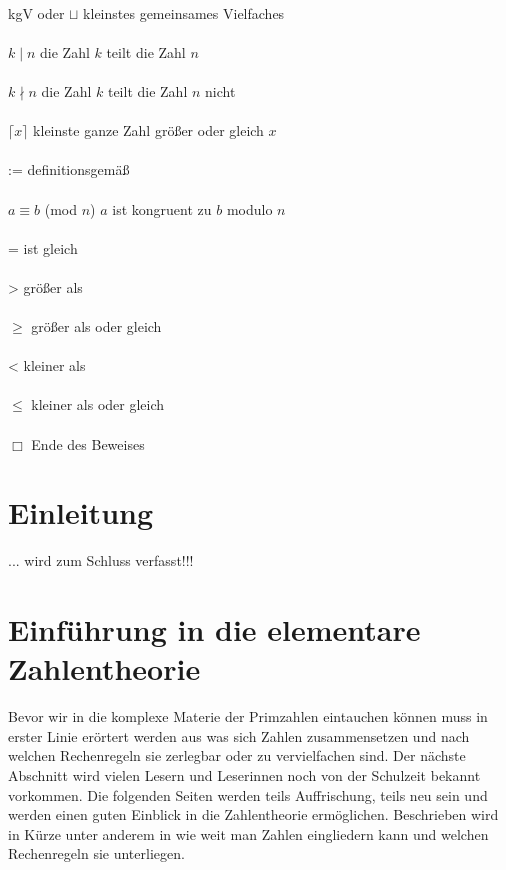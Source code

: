 \documentclass[german,12pt,a4paper]{article}
\begin{document}
\begin{tabbing}
\\kgV  oder $\sqcup$      \> kleinstes gemeinsames Vielfaches\\
\\$k \mid n$              \> die Zahl $k$ teilt die Zahl $n$\\
\\$k \nmid n$             \> die Zahl $k$ teilt die Zahl $n$ nicht\\
\\$\lceil{x}\rceil$       \> kleinste ganze Zahl größer oder gleich $x$\\
\\:=                      \> definitionsgemäß\\
\\$a\equiv b$ (mod $n$)   \> $a$ ist kongruent zu $b$ modulo $n$\\
\\=                       \> ist gleich\\
\\>                       \> größer als\\
\\$\geq$                  \> größer als oder gleich\\
\\<                       \> kleiner als\\
\\$\leq$                  \> kleiner als oder gleich\\
\\$\Box$                  \> Ende des Beweises

\end{tabbing}
\newpage

\section*{Einleitung}
... wird zum Schluss verfasst!!!\newpage

\setcounter{section}{0}
\setcounter{page}{1}
\section{Einführung in die elementare Zahlentheorie}
Bevor wir in die komplexe Materie der Primzahlen eintauchen können muss in erster Linie erörtert werden aus was sich Zahlen zusammensetzen und nach welchen Rechenregeln sie zerlegbar oder zu vervielfachen sind.
Der nächste Abschnitt wird vielen Lesern und Leserinnen noch von der Schulzeit bekannt vorkommen.
Die folgenden Seiten werden teils Auffrischung, teils neu sein und werden einen guten Einblick in die Zahlentheorie ermöglichen.
Beschrieben wird in Kürze unter anderem in wie weit man Zahlen eingliedern kann und welchen Rechenregeln sie unterliegen.
\end{document}
